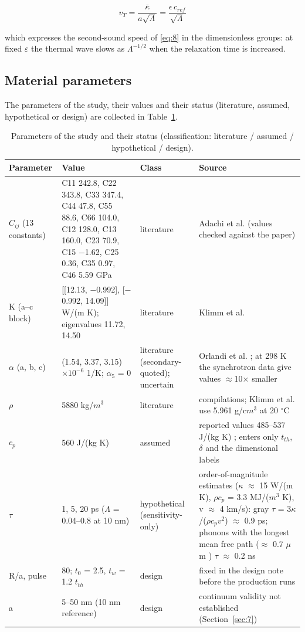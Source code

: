 \documentclass[preprint,12pt]{elsarticle}
\begin{document}
\begin{equation}
v_T=\frac{\bar\kappa}{a\sqrt{\Lambda}}=\frac{\epsilon\,c_{ref}}{\sqrt{\Lambda}} 
\label{eq:34}
\end{equation}

which expresses the second-sound speed of \eqref{eq:8} in the dimensionless groups: at fixed $\varepsilon$ the thermal wave slows as $\Lambda^{-1/2}$ when the relaxation time is increased.

\subsection{Material parameters}
\label{sec:2.8}

The parameters of the study, their values and their status (literature, assumed, hypothetical or design) are collected in Table~\ref{tab:4}.

\begin{table}[htbp]
\centering
\caption{Parameters of the study and their status (classification: literature / assumed / hypothetical / design).}
\label{tab:4}
\begin{tabularx}{\textwidth}{lXXX}
\toprule
Parameter & Value & Class & Source \\
\midrule
$C_{ij}$ (13 constants) & C11 242.8, C22 343.8, C33 347.4, C44 47.8, C55 88.6, C66 104.0, C12 128.0, C13 160.0, C23 70.9, C15 $-$1.62, C25 0.36, C35 0.97, C46 5.59 GPa & literature & Adachi et al. \cite{adachi2018} (values checked against the paper) \\
K (a--c block) & [[12.13, $-$0.992], [$-$0.992, 14.09]] W/(m K); eigenvalues 11.72, 14.50 & literature & Klimm et al. \cite{klimm2023} \\
$\alpha$ (a, b, c) & (1.54, 3.37, 3.15)$\times 10^{-6}$ 1/K; $\alpha_{5}$ = 0 & literature (secondary-quoted); uncertain & Orlandi et al. \cite{orlandi2015}; at 298 K the synchrotron data \cite{cheng2018} give values $\approx$10$\times$ smaller \\
$\rho$ & 5880 kg/$m^{3}$ & literature & compilations; Klimm et al. \cite{klimm2023} use 5.961 g/c$m^{3}$ at 20 $^{\circ}$C \\
$c_{p}$ & 560 J/(kg K) & assumed & reported values 485--537 J/(kg K) \cite{handwerg2016}; enters only $t_{th}$, $\delta$ and the dimensional labels \\
$\tau$ & 1, 5, 20 ps ($\Lambda$ = 0.04--0.8 at 10 nm) & hypothetical (sensitivity-only) & order-of-magnitude estimates ($\kappa$ $\approx$ 15 W/(m K), $\rho c_{p}$ = 3.3 MJ/($m^{3}$ K), v $\approx$ 4 km/s): gray $\tau$ = 3$\kappa$/($\rho c_{p}v^{2}$) $\approx$ 0.9 ps; phonons with the longest mean free path ($\approx$ 0.7 $\mu$m \cite{yang2023}) $\tau$ $\approx$ 0.2 ns \\
R/a, pulse & 80; $t_{0}$ = 2.5, $t_{w}$ = 1.2 $t_{th}$ & design & fixed in the design note before the production runs \\
a & 5--50 nm (10 nm reference) & design & continuum validity not established (Section~\ref{sec:7}) \\
\bottomrule
\end{tabularx}
\end{table}
\end{document}

